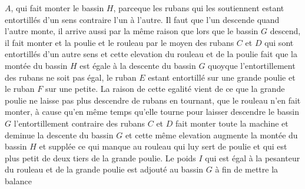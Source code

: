 $A$, qui fait monter le bassin\protect{} $H$, parceque les rubans\protect{} qui les soutiennent estant entortill\'{e}s d'un sens contraire l'un \`{a} l'autre. Il faut que l'un descende quand l'autre monte, il arrive aussi par
la m\^{e}me raison que lors que le bassin\protect{} $G$ descend, il fait monter et la poulie\protect{} et le rouleau\protect{}
par le moyen des rubans\protect{} $C$ et $D$
qui sont entortill\'{e}s d'un autre sens et cette elevation du rouleau\protect{}
et de la poulie\protect{} fait que la mont\'{e}e du bassin\protect{} $H$ est \'{e}gale \`{a} la
descente du bassin\protect{} $G$ quoyque l'entortillement\protect{} des rubans\protect{} ne soit pas \'{e}gal, le ruban\protect{} $E$ estant
entortill\'{e} sur une grande poulie\protect{} et le ruban\protect{} $F$ sur une petite. La raison de cette egalit\'{e}
vient de ce que la grande poulie\protect{} ne laisse pas plus descendre de rubans\protect{} en tournant, que le
rouleau\protect{}
n'en fait monter, \`{a} cause qu'en m\^{e}me temps qu'elle tourne pour laisser descendre le bassin\protect{} $G$ l'entortillement\protect{} contraire des rubans\protect{} $C$ et $D$ fait monter toute la machine\protect{}
et deminue la descente du bassin\protect{} $G$ et cette m\^{e}me elevation augmente la mont\'{e}e du bassin\protect{} $H$ et suppl\'{e}e ce qui manque au rouleau\protect{}
qui luy sert de poulie\protect{} et qui est plus petit de deux tiers de la grande poulie\protect{}. Le poids
$I$ qui est \'{e}gal \`{a} la pesanteur\protect{} du rouleau\protect{}
et de la grande poulie\protect{} est adjout\'{e} au bassin\protect{} $G$ \`{a} fin de
mettre la balance\protect{}

